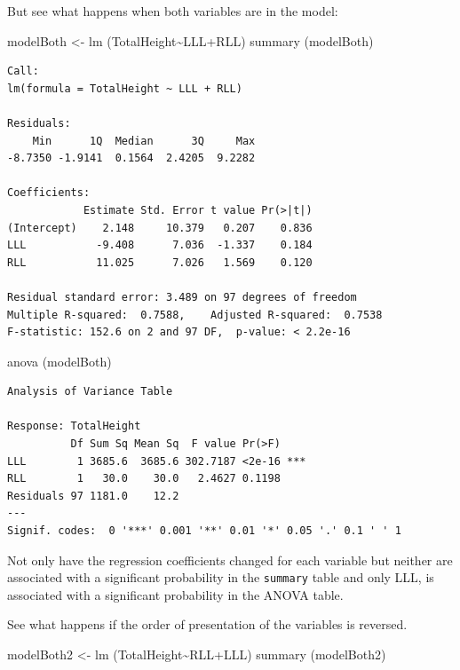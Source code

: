 \documentclass[
  oneside]{krantz}
\newenvironment{Shaded}{\begin{snugshade}}{\end{snugshade}}
\newcommand{\FunctionTok}[1]{\textcolor[rgb]{0.00,0.00,0.00}{#1}}
\newcommand{\NormalTok}[1]{#1}
\newcommand{\OtherTok}[1]{\textcolor[rgb]{0.56,0.35,0.01}{#1}}
\newcommand{\SpecialCharTok}[1]{\textcolor[rgb]{0.00,0.00,0.00}{#1}}
\begin{document}
But see what happens when both variables are in the model:

\begin{Shaded}
\begin{Highlighting}[]
\NormalTok{modelBoth }\OtherTok{\textless{}{-}} \FunctionTok{lm}\NormalTok{ (TotalHeight}\SpecialCharTok{\textasciitilde{}}\NormalTok{LLL}\SpecialCharTok{+}\NormalTok{RLL)}
\FunctionTok{summary}\NormalTok{ (modelBoth)}
\end{Highlighting}
\end{Shaded}

\begin{verbatim}
Call:
lm(formula = TotalHeight ~ LLL + RLL)

Residuals:
    Min      1Q  Median      3Q     Max 
-8.7350 -1.9141  0.1564  2.4205  9.2282 

Coefficients:
            Estimate Std. Error t value Pr(>|t|)
(Intercept)    2.148     10.379   0.207    0.836
LLL           -9.408      7.036  -1.337    0.184
RLL           11.025      7.026   1.569    0.120

Residual standard error: 3.489 on 97 degrees of freedom
Multiple R-squared:  0.7588,    Adjusted R-squared:  0.7538 
F-statistic: 152.6 on 2 and 97 DF,  p-value: < 2.2e-16
\end{verbatim}

\begin{Shaded}
\begin{Highlighting}[]
\FunctionTok{anova}\NormalTok{ (modelBoth)}
\end{Highlighting}
\end{Shaded}

\begin{verbatim}
Analysis of Variance Table

Response: TotalHeight
          Df Sum Sq Mean Sq  F value Pr(>F)    
LLL        1 3685.6  3685.6 302.7187 <2e-16 ***
RLL        1   30.0    30.0   2.4627 0.1198    
Residuals 97 1181.0    12.2                    
---
Signif. codes:  0 '***' 0.001 '**' 0.01 '*' 0.05 '.' 0.1 ' ' 1
\end{verbatim}

Not only have the regression coefficients changed for each variable but neither are associated with a significant probability in the \texttt{summary} table and only LLL, is associated with a significant probability in the ANOVA table.

See what happens if the order of presentation of the variables is reversed.

\begin{Shaded}
\begin{Highlighting}[]
\NormalTok{modelBoth2 }\OtherTok{\textless{}{-}} \FunctionTok{lm}\NormalTok{ (TotalHeight}\SpecialCharTok{\textasciitilde{}}\NormalTok{RLL}\SpecialCharTok{+}\NormalTok{LLL)}
\FunctionTok{summary}\NormalTok{ (modelBoth2)}
\end{Highlighting}
\end{Shaded}
\end{document}
